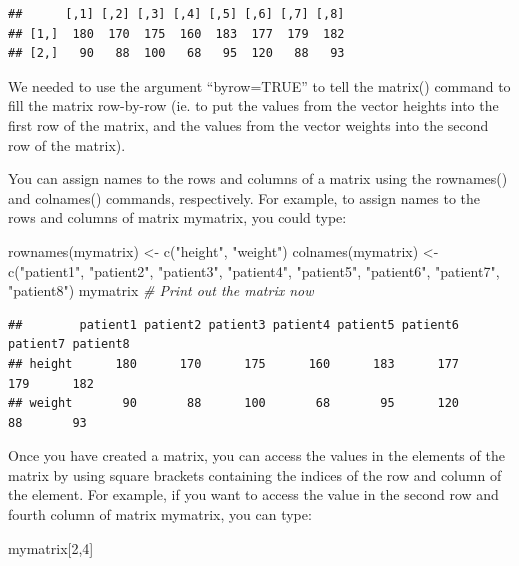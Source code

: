 \documentclass[
]{book}
\newenvironment{Shaded}{\begin{snugshade}}{\end{snugshade}}
\newcommand{\CommentTok}[1]{\textcolor[rgb]{0.56,0.35,0.01}{\textit{#1}}}
\newcommand{\DecValTok}[1]{\textcolor[rgb]{0.00,0.00,0.81}{#1}}
\newcommand{\FunctionTok}[1]{\textcolor[rgb]{0.00,0.00,0.00}{#1}}
\newcommand{\NormalTok}[1]{#1}
\newcommand{\OtherTok}[1]{\textcolor[rgb]{0.56,0.35,0.01}{#1}}
\newcommand{\StringTok}[1]{\textcolor[rgb]{0.31,0.60,0.02}{#1}}
\begin{document}
\begin{verbatim}
##      [,1] [,2] [,3] [,4] [,5] [,6] [,7] [,8]
## [1,]  180  170  175  160  183  177  179  182
## [2,]   90   88  100   68   95  120   88   93
\end{verbatim}

We needed to use the argument ``byrow=TRUE'' to tell the matrix() command to fill the matrix row-by-row (ie. to put the values from the vector heights into the first row of the matrix, and the values from the vector weights into the second row of the matrix).

You can assign names to the rows and columns of a matrix using the rownames() and colnames() commands, respectively. For example, to assign names to the rows and columns of matrix mymatrix, you could type:

\begin{Shaded}
\begin{Highlighting}[]
\FunctionTok{rownames}\NormalTok{(mymatrix) }\OtherTok{\textless{}{-}} \FunctionTok{c}\NormalTok{(}\StringTok{"height"}\NormalTok{, }\StringTok{"weight"}\NormalTok{)}
\FunctionTok{colnames}\NormalTok{(mymatrix) }\OtherTok{\textless{}{-}} \FunctionTok{c}\NormalTok{(}\StringTok{"patient1"}\NormalTok{, }\StringTok{"patient2"}\NormalTok{, }\StringTok{"patient3"}\NormalTok{, }\StringTok{"patient4"}\NormalTok{, }\StringTok{"patient5"}\NormalTok{, }\StringTok{"patient6"}\NormalTok{, }\StringTok{"patient7"}\NormalTok{, }\StringTok{"patient8"}\NormalTok{)}
\NormalTok{mymatrix }\CommentTok{\# Print out the matrix now}
\end{Highlighting}
\end{Shaded}

\begin{verbatim}
##        patient1 patient2 patient3 patient4 patient5 patient6 patient7 patient8
## height      180      170      175      160      183      177      179      182
## weight       90       88      100       68       95      120       88       93
\end{verbatim}

Once you have created a matrix, you can access the values in the elements of the matrix by using square brackets containing the indices of the row and column of the element. For example, if you want to access the value in the second row and fourth column of matrix mymatrix, you can type:

\begin{Shaded}
\begin{Highlighting}[]
\NormalTok{mymatrix[}\DecValTok{2}\NormalTok{,}\DecValTok{4}\NormalTok{]}
\end{Highlighting}
\end{Shaded}
\end{document}
